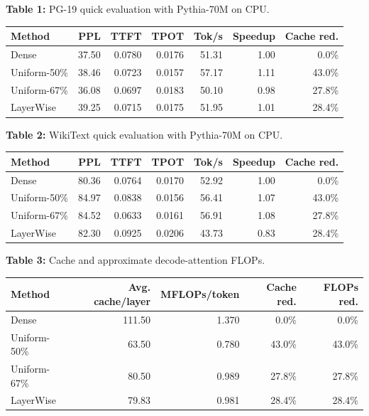 \documentclass{article}
\begin{document}
\begin{center}
\small
\setlength{\tabcolsep}{3.5pt}
\noindent\textbf{Table 1:} PG-19 quick evaluation with Pythia-70M on CPU.

\begin{tabular}{lrrrrrr}
\toprule
Method & PPL & TTFT & TPOT & Tok/s & Speedup & Cache red. \\
\midrule
Dense & 37.50 & 0.0780 & 0.0176 & 51.31 & 1.00 & 0.0\% \\
Uniform-50\% & 38.46 & 0.0723 & 0.0157 & 57.17 & 1.11 & 43.0\% \\
Uniform-67\% & 36.08 & 0.0697 & 0.0183 & 50.10 & 0.98 & 27.8\% \\
LayerWise & 39.25 & 0.0715 & 0.0175 & 51.95 & 1.01 & 28.4\% \\
\bottomrule
\end{tabular}
\end{center}

\newpage
\begin{center}
\small
\setlength{\tabcolsep}{3.5pt}
\noindent\textbf{Table 2:} WikiText quick evaluation with Pythia-70M on CPU.

\begin{tabular}{lrrrrrr}
\toprule
Method & PPL & TTFT & TPOT & Tok/s & Speedup & Cache red. \\
\midrule
Dense & 80.36 & 0.0764 & 0.0170 & 52.92 & 1.00 & 0.0\% \\
Uniform-50\% & 84.97 & 0.0838 & 0.0156 & 56.41 & 1.07 & 43.0\% \\
Uniform-67\% & 84.52 & 0.0633 & 0.0161 & 56.91 & 1.08 & 27.8\% \\
LayerWise & 82.30 & 0.0925 & 0.0206 & 43.73 & 0.83 & 28.4\% \\
\bottomrule
\end{tabular}
\end{center}

\begin{center}
\small
\setlength{\tabcolsep}{4pt}
\noindent\textbf{Table 3:} Cache and approximate decode-attention FLOPs.

\begin{tabular}{lrrrr}
\toprule
Method & Avg. cache/layer & MFLOPs/token & Cache red. & FLOPs red. \\
\midrule
Dense & 111.50 & 1.370 & 0.0\% & 0.0\% \\
Uniform-50\% & 63.50 & 0.780 & 43.0\% & 43.0\% \\
Uniform-67\% & 80.50 & 0.989 & 27.8\% & 27.8\% \\
LayerWise & 79.83 & 0.981 & 28.4\% & 28.4\% \\
\bottomrule
\end{tabular}
\end{center}
\end{document}
